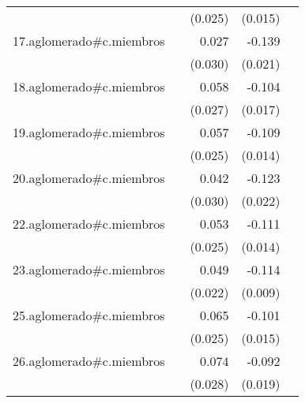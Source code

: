 {\begin{longtable}{l*{4}{D{.}{.}{-1}}}
            &                     &     (0.025)         &     (0.015)         &                     \\
\addlinespace
17.aglomerado#c.miembros&                     &       0.027         &      -0.139\sym{***}&                     \\
            &                     &     (0.030)         &     (0.021)         &                     \\
\addlinespace
18.aglomerado#c.miembros&                     &       0.058\sym{*}  &      -0.104\sym{***}&                     \\
            &                     &     (0.027)         &     (0.017)         &                     \\
\addlinespace
19.aglomerado#c.miembros&                     &       0.057\sym{*}  &      -0.109\sym{***}&                     \\
            &                     &     (0.025)         &     (0.014)         &                     \\
\addlinespace
20.aglomerado#c.miembros&                     &       0.042         &      -0.123\sym{***}&                     \\
            &                     &     (0.030)         &     (0.022)         &                     \\
\addlinespace
22.aglomerado#c.miembros&                     &       0.053\sym{*}  &      -0.111\sym{***}&                     \\
            &                     &     (0.025)         &     (0.014)         &                     \\
\addlinespace
23.aglomerado#c.miembros&                     &       0.049\sym{*}  &      -0.114\sym{***}&                     \\
            &                     &     (0.022)         &     (0.009)         &                     \\
\addlinespace
25.aglomerado#c.miembros&                     &       0.065\sym{*}  &      -0.101\sym{***}&                     \\
            &                     &     (0.025)         &     (0.015)         &                     \\
\addlinespace
26.aglomerado#c.miembros&                     &       0.074\sym{**} &      -0.092\sym{***}&                     \\
            &                     &     (0.028)         &     (0.019)         &                     \\

\end{longtable}}
